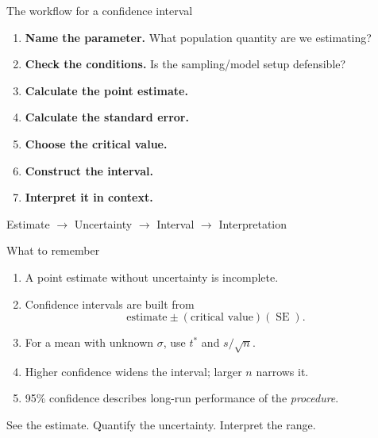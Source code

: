 \documentclass[11pt,aspectratio=169]{beamer}
\newcommand{\SE}{\operatorname{SE}}
\begin{document}
\begin{frame}{The workflow for a confidence interval}
\begin{enumerate}
  \item \textbf{Name the parameter.} What population quantity are we estimating?
  \item \textbf{Check the conditions.} Is the sampling/model setup defensible?
  \item \textbf{Calculate the point estimate.}
  \item \textbf{Calculate the standard error.}
  \item \textbf{Choose the critical value.}
  \item \textbf{Construct the interval.}
  \item \textbf{Interpret it in context.}
\end{enumerate}

\vfill
\begin{center}
\Large Estimate $\rightarrow$ Uncertainty $\rightarrow$ Interval $\rightarrow$ Interpretation
\end{center}
\end{frame}

\begin{frame}{What to remember}
\begin{enumerate}
  \item A point estimate without uncertainty is incomplete.
  \item Confidence intervals are built from
  \[
  \text{estimate}\pm(\text{critical value})(\SE).
  \]
  \item For a mean with unknown $\sigma$, use $t^*$ and $s/\sqrt{n}$.
  \item Higher confidence widens the interval; larger $n$ narrows it.
  \item 95\% confidence describes long-run performance of the \emph{procedure}.
\end{enumerate}

\vfill
\begin{center}
\Large See the estimate. Quantify the uncertainty. Interpret the range.
\end{center}
\end{frame}
\end{document}
